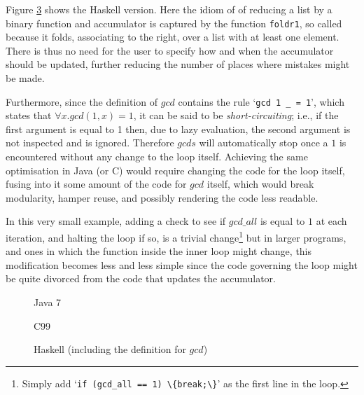 Figure \ref{fig:gcds:haskell} shows the Haskell version. Here the idiom
of of reducing a list by a binary function and accumulator is captured
by the function \lstinline|foldr1|, so called because it folds,
associating to the right, over a list with at least one element. There is thus no 
need for the user to specify how and when the accumulator should be updated,
further reducing the number of places where mistakes might be made.

Furthermore, since the definition of $gcd$ contains the rule
`\lstinline|gcd 1 _ = 1|',
which states that $\forall x. gcd (1, x) = 1$, it can be said to be
\emph{short-circuiting}; i.e., if the first argument is equal to 1 then, due
to lazy evaluation, the second argument is not inspected and is ignored.
Therefore $gcds$ will automatically stop once a $1$ is encountered without any
change to the loop itself. Achieving the same optimisation in Java (or C) would
require changing the code for the loop itself, fusing into it some amount of the code
for $gcd$ itself, which would break
modularity, hamper reuse, and possibly rendering the code less readable.

In this very small example, adding a check to see if $gcd\_all$ is equal to $1$ at each 
iteration, and halting the loop if so, is a trivial change\footnote{Simply add `\lstinline|if (gcd_all == 1) \{break;\}|' as the first line in the loop.}
but in larger programs, and ones in which the function inside the inner loop might change,
this modification becomes less and less simple since the code governing the loop might be
quite divorced from the code that updates the accumulator.


\begin{figure}

\caption{Java 7}
\label{fig:gcds:java}
\end{figure}

\begin{figure}

\caption{C99}
\label{fig:gcds:c}
\end{figure}

\begin{figure}

\caption{Haskell (including the definition for $gcd$)}
\label{fig:gcds:haskell}
\end{figure}
